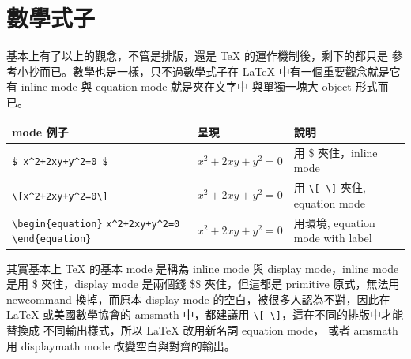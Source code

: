 \chapter{數學式子}
基本上有了以上的觀念，不管是排版，還是 {\TeX} 的運作機制後，剩下的都只是
參考小抄而已。數學也是一樣，只不過數學式子在 {\LaTeX} 中有一個重要觀念就是它有
inline mode 與 equation mode 就是夾在文字中 與單獨一塊大 object 形式而已。
\begin{center}
\begin{tabular}{m{3cm}m{4cm}m{3cm}}
mode 例子 & 呈現 & 說明\\
\hline
\verb|$ x^2+2xy+y^2=0 $|&$x^2+2xy+y^2=0 $& 用 \$ 夾住，inline mode\\
\verb|\[x^2+2xy+y^2=0\]|&\[x^2+2xy+y^2=0\]& 用 \verb=\[ \]= 夾住, equation mode\\
\verb|\begin{equation}|
\verb|x^2+2xy+y^2=0|
\verb|\end{equation}|&\begin{equation}x^2+2xy+y^2=0\end{equation}&
	 用環境, equation mode with label \\
\end{tabular}
\end{center}

其實基本上 \TeX{} 的基本 mode 是稱為 inline mode 與 display mode，inline mode
是用 \$ 夾住，display mode 是兩個錢 \$\$ 夾住，但這都是 primitive 原式，無法用
newcommand 換掉，而原本 display mode 的空白，被很多人認為不對，因此在 \LaTeX{}
或美國數學協會的 amsmath 中，都建議用 \verb=\[ \]=，這在不同的排版中才能替換成
不同輸出樣式，所以 \LaTeX{} 改用新名詞 equation mode， 或者 amsmath 用
displaymath mode 改變空白與對齊的輸出。

